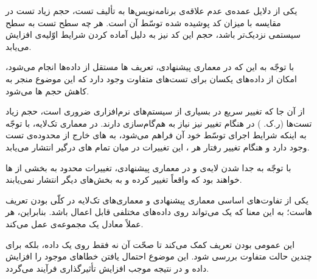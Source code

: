 
یکی از دلایل عمده‌ی عدم علاقه‌ی برنامه‌نویس‌ها به تألیف تست، حجم زیاد تست در مقایسه با میزان کد پوشیده شده توسّط آن است. هر چه سطح تست به سطح سیستمی نزدیک‌تر باشد، حجم این کد نیز به دلیل آماده کردن شرایط اوّلیه‌ی  افزایش می‌یابد.

با توجّه به این که در معماری پیشنهادی، تعریف ها مستقل از داده‌ها انجام می‌شود، امکان  از داده‌های یکسان برای تست‌های متفاوت وجود دارد که این موضوع منجر به کاهش حجم ها می‌شود.

از آن جا که تغییر سریع در بسیاری از سیستم‌های نرم‌افزاری ضروری است، حجم زیاد تست‌ها (ر.ک. ) در هنگام تغییر نیز نیاز به هم‌گام‌سازی دارند. در معماری تک‌لایه، با توجّه به اینکه شرایط اجرای  توسّط خود آن فراهم می‌شود،  به های خارج از محدوده‌ی تست وجود دارد و هنگام تغییر رفتار هر ، این تغییرات در میان تمام های درگیر انتشار می‌یابد.

با توجّه به جدا شدن لایه‌ی  و  در معماری پیشنهادی، تغییرات محدود به بخشی از ها خواهند بود که واقعاً تغییر کرده و به بخش‌های دیگر انتشار نمی‌یابند.


یکی از تفاوت‌های اساسی معماری پیشنهادی و معماری‌های تک‌لایه در کلّی بودن تعریف هاست؛ به این معنا که یک  می‌تواند روی داده‌های مختلفی قابل اعمال باشد. بنابراین، هر  عملاً معادل یک مجموعه‌ی  عمل می‌کند.

این عمومی بودن تعریف  کمک می‌کند تا صحّت آن نه فقط روی یک داده، بلکه برای چندین حالت متفاوت بررسی شود. این موضوع احتمال یافتن خطاهای موجود را افزایش داده و در نتیجه موجب افزایش تأثیرگذاری فرآیند  می‌گردد.
